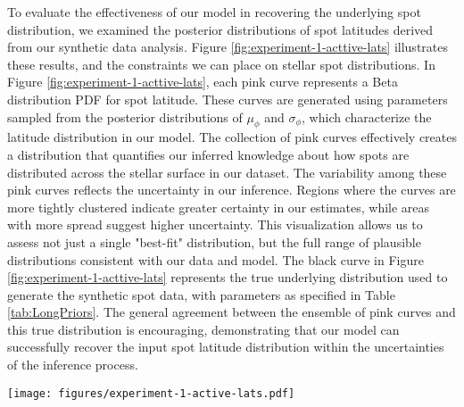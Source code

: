 \documentclass[twocolumn]{aastex631}
\begin{document}
%
To evaluate the effectiveness of our model in recovering the underlying spot distribution, we examined the posterior distributions of spot latitudes 
derived from our synthetic data analysis. Figure \ref{fig:experiment-1-acttive-lats} illustrates these results, and the constraints we can place on 
stellar spot distributions. In Figure \ref{fig:experiment-1-acttive-lats}, each pink curve represents a Beta distribution PDF for spot latitude. 
These curves are generated using parameters sampled from the posterior distributions of $\mu_\phi$ and $\sigma_\phi$, which characterize the 
latitude distribution in our model. The collection of pink curves effectively creates a distribution that quantifies our inferred knowledge about 
how spots are distributed across the stellar surface in our dataset. The variability among these pink curves reflects the uncertainty in our inference. 
Regions where the curves are more tightly clustered indicate greater certainty in our estimates, while areas with more spread suggest higher uncertainty. 
This visualization allows us to assess not just a single "best-fit" distribution, but the full range of plausible distributions consistent with our data and model.
The black curve in Figure \ref{fig:experiment-1-acttive-lats} represents the true underlying distribution used to generate the synthetic spot data, 
with parameters as specified in Table \ref{tab:LongPriors}. The general agreement between the ensemble of pink curves and this 
true distribution is encouraging, demonstrating that our model can successfully recover the input spot latitude distribution within the 
uncertainties of the inference process.
%
\begin{figure*}[hbt!]
    \begin{centering}
        \texttt{[image: figures/experiment-1-active-lats.pdf]}
        \caption{
            Posterior distributions of spot latitudes derived from synthetic data analysis. The pink curves represent individual Beta distribution 
            probability density functions (PDFs) for spot latitude, each generated using parameters sampled from the posterior distributions of 
            $\mu_\phi$ and $\sigma_\phi$ (Figure \ref{fig:experiment-1-map-corner-all}). The ensemble of pink curves illustrates the range of 
            plausible spot latitude distributions, effectively quantifying our inferred knowledge about spot distribution patterns across the stellar surface 
            in our dataset. The black curve shows the true underlying distribution used to generate the synthetic spot data (parameters given in Table 
            \ref{tab:LongPriors}). Note the general agreement between the inferred distributions and the true distribution, 
            demonstrating the model's ability to recover the input spot latitude distribution within the uncertainties of the inference process.
        }
        \label{fig:experiment-1-acttive-lats}
    \end{centering}
\end{figure*}
\end{document}

